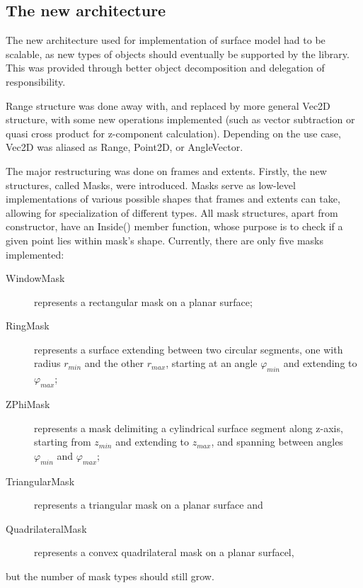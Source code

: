 \documentclass[12pt, a4paper]{article}
\begin{document}
\subsection{The new architecture}

The new architecture used for implementation of surface model had to be scalable, as new types of objects should eventually be supported by the library. This was provided through better object decomposition and delegation of responsibility.

Range structure was done away with, and replaced by more general Vec2D structure, with some new operations implemented (such as vector subtraction or quasi cross product for z-component calculation). Depending on the use case, Vec2D was aliased as Range, Point2D, or AngleVector. 

The major restructuring was done on frames and extents. Firstly, the new structures, called Masks, were introduced. Masks serve as low-level implementations of various possible shapes that frames and extents can take, allowing for specialization of different types. All mask structures, apart from constructor, have an {\selectfont Inside()} member function, whose purpose is to check if a given point lies within mask's shape. Currently, there are only five masks implemented:
\begin{description}
	\item [WindowMask] represents a rectangular mask on a planar surface;
	\item [RingMask] represents a surface extending between two circular segments, one with radius $r_{min}$ and the other $r_{max}$, starting at an angle $\varphi_{min}$ and extending to $\varphi_{max}$;
	\item [ZPhiMask] represents a mask delimiting a cylindrical surface segment along z-axis, starting from $z_{min}$ and extending to $z_{max}$, and spanning between angles $\varphi_{min}$ and $\varphi_{max}$;
	\item[TriangularMask\footnotemark] represents a triangular mask on a planar surface and
	\item[QuadrilateralMask] represents a convex quadrilateral mask on a planar surfacel,
\end{description}
but the number of mask types should still grow.
\end{document}
